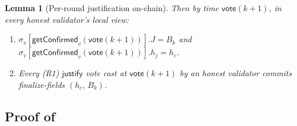\ifx\litemode\undefined\documentclass{article}\fi
\newcommand{\just}{\ensuremath{\mathsf{justify}}\xspace}
\newcommand{\vote}{\mathsf{vote}}
\newcommand{\getConfirmed}{\textsf{getConfirmed}\xspace}
\theoremstyle{plain}
\newtheorem{lemma}{Lemma}
\theoremstyle{definition}
\theoremstyle{remark}
\begin{document}
\begin{lemma}[Per-round justification on-chain]
Then by time $\vote(k+1)$, in every honest validator's local view:
\begin{enumerate}
  \item[\textnormal{(C1)}] $\sigma_v[\getConfirmed_v(\vote(k+1))].J = B_k$ and $\sigma_v[\getConfirmed_v(\vote(k+1))].h_j = h_c$.
  \item[\textnormal{(C2)}] Every \mbox{(R1)} \just vote cast at $\vote(k+1)$ by an honest validator commits finalize-fields $(h_c,\, B_k)$.
\end{enumerate}
\end{lemma}

\subsection{Proof of }\label{rev:subsec:per-round-proof}
\end{document}
